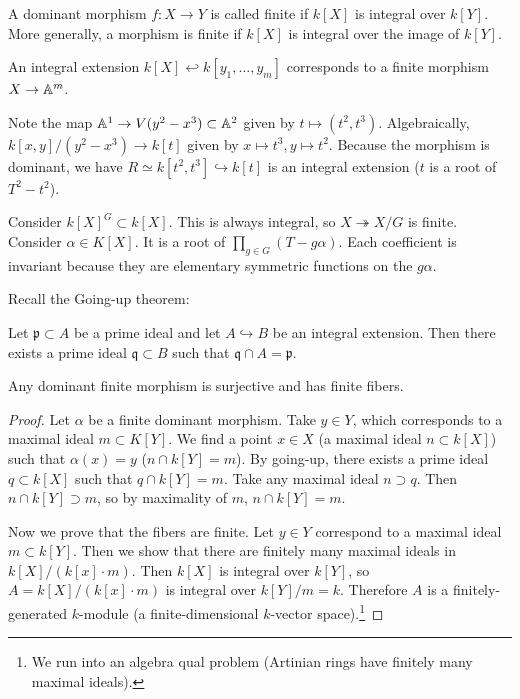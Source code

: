 \documentclass[twoside, 10pt]{article}
\begin{document}
    \begin{defn}
        A dominant morphism $f: X \rightarrow Y$ is called finite if $k[X]$ is integral over $k[Y]$. More generally, a morphism is finite if $k[X]$ is integral over the image of $k[Y]$.
    \end{defn}

    \begin{exm}
        An integral extension $k[X] \hookleftarrow k[y_1, \ldots, y_m]$ corresponds to a finite morphism $X \rightarrow \mathbb{A}^m$.
    \end{exm}

    \begin{exm}
        Note the map $\mathbb{A}^1 \rightarrow V(y^2-x^3) \subset \mathbb{A}^2$ given by $t \mapsto (t^2,t^3)$. Algebraically, $k[x,y]/(y^2-x^3) \rightarrow k[t]$ given by $x \mapsto t^3, y \mapsto t^2$. Because the morphism is dominant, we have $R \simeq k[t^2, t^3] \hookrightarrow k[t]$ is an integral extension ($t$ is a root of $T^2-t^2$).
    \end{exm}

    \begin{exm}
        Consider $k[X]^G \subset k[X]$. This is always integral, so $X \twoheadrightarrow X/G$ is finite. Consider $\alpha \in K[X]$. It is a root of $\prod_{g \in G}(T-g\alpha)$. Each coefficient is invariant because they are elementary symmetric functions on the $g\alpha$.
    \end{exm}

    Recall the Going-up theorem:

    \begin{thm}[Going-up]
        Let $\mathfrak{p} \subset A$ be a prime ideal and let $A \hookrightarrow B$ be an integral extension. Then there exists a prime ideal $\mathfrak{q} \subset B$ such that $\mathfrak{q} \cap A = \mathfrak{p}$.
    \end{thm}

    \begin{thm}
        Any dominant finite morphism is surjective and has finite fibers.
        \begin{proof}
            Let $\alpha$ be a finite dominant morphism. Take $y \in Y$, which corresponds to a maximal ideal $m \subset K[Y]$. We find a point $x \in X$ (a maximal ideal $n \subset k[X]$) such that $\alpha(x) = y$ ($n \cap k[Y] = m$). By going-up, there exists a prime ideal $q \subset k[X]$ such that $q \cap k[Y] = m$. Take any maximal ideal $n \supset q$. Then $n \cap k[Y] \supset m$, so by maximality of $m$, $n \cap k[Y] = m$.

            Now we prove that the fibers are finite. Let $y \in Y$ correspond to a maximal ideal $m \subset k[Y]$. Then we show that there are finitely many maximal ideals in $k[X]/(k[x]\cdot m)$. Then $k[X]$ is integral over $k[Y]$, so $A = k[X]/(k[x]\cdot m)$ is integral over $k[Y]/m = k$. Therefore $A$ is a finitely-generated $k$-module (a finite-dimensional $k$-vector space).\footnote{We run into an algebra qual problem (Artinian rings have finitely many maximal ideals).}
        \end{proof}
    \end{thm}
\end{document}
